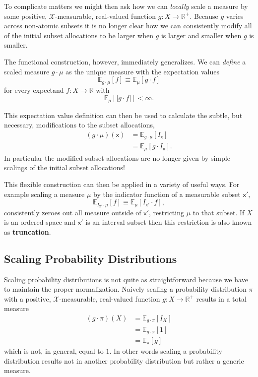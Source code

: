 \documentclass[
  letterpaper,
  DIV=11,
  numbers=noendperiod]{scrartcl}
\begin{document}
To complicate matters we might then ask how we can \emph{locally} scale
a measure by some positive, \(\mathcal{X}\)-measurable, real-valued
function \(g: X \rightarrow \mathbb{R}^{+}\). Because \(g\) varies
across non-atomic subsets it is no longer clear how we can consistently
modify all of the initial subset allocations to be larger when \(g\) is
larger and smaller when \(g\) is smaller.

The functional construction, however, immediately generalizes. We can
\emph{define} a scaled measure \(g \cdot \mu\) as the unique measure
with the expectation values \[
\mathbb{E}_{g \cdot \mu} [ f ] \equiv \mathbb{E}_{\mu} [ g \cdot f ]
\] for every expectand \(f: X \rightarrow \mathbb{R}\) with \[
\mathbb{E}_{\mu} [ | g \cdot f | ] < \infty.
\]

This expectation value definition can then be used to calculate the
subtle, but necessary, modifications to the subset allocations,
\begin{align*}
(g \cdot \mu)(\mathsf{x})
&=
\mathbb{E}_{g \cdot \mu} [ I_{\mathsf{x}} ]
\\
&=
\mathbb{E}_{\mu} [ g \cdot I_{\mathsf{x}} ].
\end{align*} In particular the modified subset allocations are no longer
given by simple scalings of the initial subset allocations!

This flexible construction can then be applied in a variety of useful
ways. For example scaling a measure \(\mu\) by the indicator function of
a measurable subset \(\mathsf{x}'\), \[
\mathbb{E}_{I_{\mathsf{x}'} \cdot \mu} [ f ]
\equiv
\mathbb{E}_{\mu} [ I_{\mathsf{x}'} \cdot f ],
\] consistently zeroes out all measure outside of \(\mathsf{x}'\),
restricting \(\mu\) to that subset. If \(X\) is an ordered space and
\(\mathsf{x}'\) is an interval subset then this restriction is also
known as \textbf{truncation}.

\hypertarget{scaling-probability-distributions}{%
\subsection{Scaling Probability
Distributions}\label{scaling-probability-distributions}}

Scaling probability distributions is not quite as straightforward
because we have to maintain the proper normalization. Naively scaling a
probability distribution \(\pi\) with a positive,
\(\mathcal{X}\)-measurable, real-valued function
\(g : X \rightarrow \mathbb{R}^{+}\) results in a total measure
\begin{align*}
(g \cdot \pi)(X)
&=
\mathbb{E}_{g \cdot \pi} [ I_{X} ]
\\
&=
\mathbb{E}_{g \cdot \pi} [ 1 ]
\\
&=
\mathbb{E}_{\pi} [ g ]
\end{align*} which is not, in general, equal to \(1\). In other words
scaling a probability distribution results not in another probability
distribution but rather a generic measure.
\end{document}
